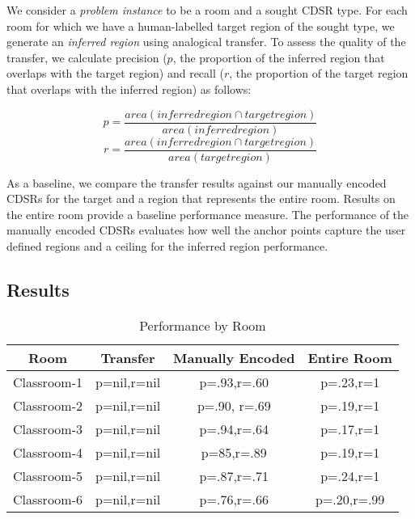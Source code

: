 We consider a \textit{problem instance} to be a room and a sought CDSR type. For each room for which we have a human-labelled target region of the sought type, we generate an \textit{inferred region} using analogical transfer. To assess the quality of the transfer, we calculate precision ($p$, the proportion of the inferred region that overlaps with the target region) and recall ($r$, the proportion of the target region that overlaps with the inferred region) as follows:

\begin{equation}
	p=\frac{area(inferred region \cap target region)}{area(inferred region)}
\end{equation}
\begin{equation}
	r=\frac{area(inferred region \cap target region)}{area(target region)}
\end{equation}


As a baseline, we compare the transfer results against our manually encoded CDSRs for the target and a region that represents the entire room. Results on the entire room provide a baseline performance measure. The performance of the manually encoded CDSRs evaluates how well the anchor points capture the user defined regions and a ceiling for the inferred region performance.


\subsection{Results}
\begin{table}
\small
\caption{Performance by Room}
\begin{tabular}{|c|c|c|c|}
\hline
Room & Transfer & Manually Encoded & Entire Room \\
\hline
Classroom-1 & p=nil,r=nil & p=.93,r=.60 & p=.23,r=1 \\
Classroom-2 & p=nil,r=nil & p=.90, r=.69 & p=.19,r=1 \\
Classroom-3 & p=nil,r=nil & p=.94,r=.64 & p=.17,r=1 \\
Classroom-4 & p=nil,r=nil & p=85,r=.89 & p=.19,r=1 \\  %
Classroom-5 & p=nil,r=nil & p=.87,r=.71 & p=.24,r=1 \\ %
Classroom-6 & p=nil,r=nil & p=.76,r=.66 & p=.20,r=.99 \\ %
\hline
\end{tabular}
\end{table}


